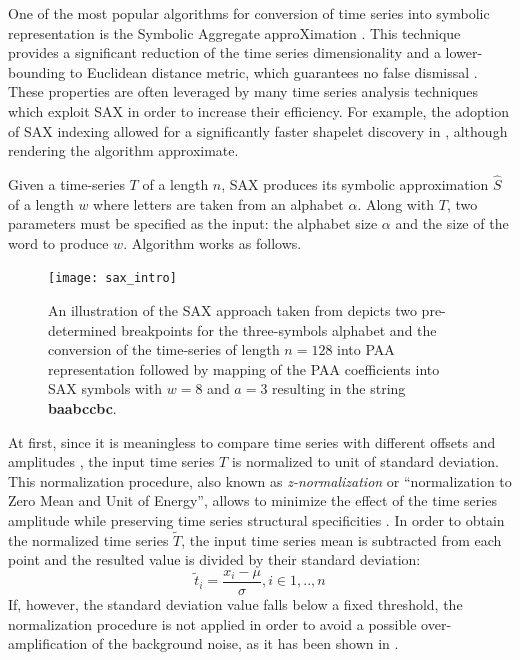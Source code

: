 One of the most popular algorithms for conversion of time series into symbolic representation is the Symbolic Aggregate approXimation \cite{sax}. 
This technique provides a significant reduction of the time series dimensionality and a lower-bounding to Euclidean distance 
metric, which guarantees no false dismissal \cite{citeulike:2821475}. 
These properties are often leveraged by many time series analysis techniques which exploit SAX in order to increase their efficiency. 
For example, the adoption of SAX indexing allowed for a significantly faster shapelet discovery in \cite{citeulike:12563493}, 
although rendering the algorithm approximate. 

Given a time-series $T$ of a length $n$, SAX produces its symbolic approximation $\hat{S}$ of a length $w$ where letters are taken 
from an alphabet $\alpha$. Along with $T$, two parameters must be specified as the input: the alphabet size $\alpha$ and the size of 
the word to produce $w$. Algorithm works as follows. 

\begin{figure}[tbp]
   \centering
   \texttt{[image: sax\_intro]}
   \caption{An illustration of the SAX approach taken from \cite{citeulike:2821475} depicts two pre-determined breakpoints for the 
   three-symbols alphabet and the conversion of the time-series of length $n=128$ into PAA representation followed by mapping of 
   the PAA coefficients into SAX symbols with $w=8$ and $a=3$ resulting in the string \textbf{baabccbc}.}
   \label{fig:sax_intro}
\end{figure}

At first, since it is meaningless to compare time series with different offsets and amplitudes \cite{citeulike:532340}, the input time 
series $T$ is normalized to unit of standard deviation. This normalization procedure, also known as \textit{z-normalization} or 
``normalization to Zero Mean and Unit of Energy'', allows to minimize the effect of the time series amplitude while preserving time 
series structural specificities \cite{citeulike:3815880}. In order to obtain the normalized time series $\widetilde{T}$, the 
input time series mean is subtracted from each point and the resulted value is divided by their standard deviation:
\begin{equation}
\widetilde{t}_{i} = \frac{x_{i}-\mu}{\sigma}, i \in {1,..,n}
\label{eq:znorm}
\end{equation}
If, however, the standard deviation value falls below a fixed threshold, the normalization procedure is not applied in order to avoid 
a possible over-amplification of the background noise, as it has been shown in \cite{citeulike:2821475}.

